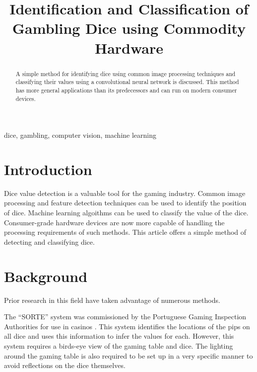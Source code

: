\documentclass[conference]{IEEEtran}
\begin{document}
\title{
	Identification and Classification of Gambling Dice using Commodity Hardware
}

\author{
}

\maketitle

\begin{abstract}
	A simple method for identifying dice using common image processing techniques and classifying their values using a convolutional neural network is discussed.
	This method has more general applications than its predecessors and can run on modern consumer devices.
\end{abstract}

\begin{IEEEkeywords}
	dice, gambling, computer vision, machine learning
\end{IEEEkeywords}

\section{Introduction}

Dice value detection is a valuable tool for the gaming industry.
Common image processing and feature detection techniques can be used to identify the position of dice.
Machine learning algoithms can be used to classify the value of the dice.
Consumer-grade hardware devices are now more capable of handling the processing requirements of such methods.
This article offers a simple method of detecting and classifying dice.

\section{Background}

Prior research in this field have taken advantage of numerous methods.

The ``SORTE'' system was commissioned by the Portuguese Gaming Inspection Authorities for use in casinos \cite{Correia1995}.
This system identifies the locations of the pips on all dice and uses this information to infer the values for each.
However, this system requires a birds-eye view of the gaming table and dice.
The lighting around the gaming table is also required to be set up in a very specific manner to avoid reflections on the dice themselves.
\end{document}
